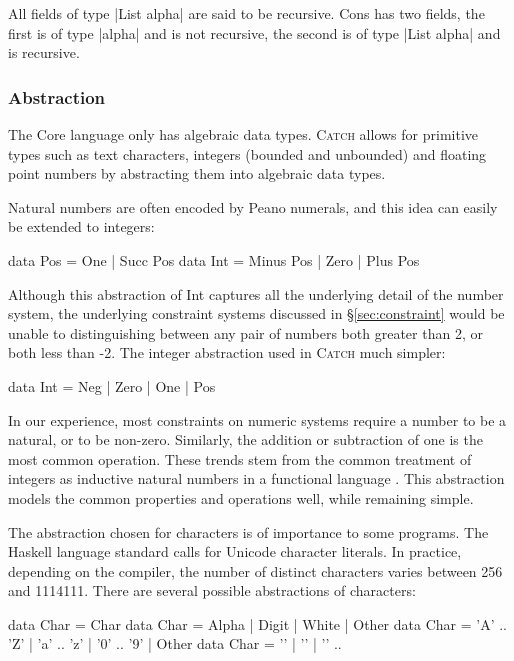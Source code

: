 \documentclass[preprint]{sigplanconf}
\newcommand{\C}[1]{\textsf{#1}}
\newcommand{\catch}{\textsc{Catch}}
\begin{document}
All fields of type |List alpha| are said to be recursive. \C{Cons} has two fields, the first is of type |alpha| and is not recursive, the second is of type |List alpha| and is recursive.

\subsubsection{Abstraction}
\label{sec:abstraction}

The Core language only has algebraic data types. \catch{} allows for primitive types such as text characters, integers (bounded and unbounded) and floating point numbers by abstracting them into algebraic data types.

Natural numbers are often encoded by Peano numerals, and this idea can easily be extended to integers:

\begin{code}
data Pos  = One | Succ Pos
data Int  = Minus Pos | Zero | Plus Pos
\end{code}

Although this abstraction of \C{Int} captures all the underlying detail of the number system, the underlying constraint systems discussed in \S\ref{sec:constraint} would be unable to distinguishing between any pair of numbers both greater than 2, or both less than -2. The integer abstraction used in \catch{} much simpler:

\begin{code}
data Int = Neg | Zero | One | Pos
\end{code}

In our experience, most constraints on numeric systems require a number to be a natural, or to be non-zero. Similarly, the addition or subtraction of one is the most common operation. These trends stem from the common treatment of integers as inductive natural numbers in a functional language \citep{runciman:naturals}. This abstraction models the common properties and operations well, while remaining simple.

The abstraction chosen for characters is of importance to some programs. The Haskell language standard calls for Unicode character literals. In practice, depending on the compiler, the number of distinct characters varies between 256 and 1114111. There are several possible abstractions of characters:

\begin{code}
data Char = Char
data Char = Alpha | Digit | White | Other
data Char = 'A' .. 'Z' | 'a' .. 'z' | '0' .. '9' | Other
data Char = '\0' | '\1' | '\2' ..
\end{code}
\end{document}
